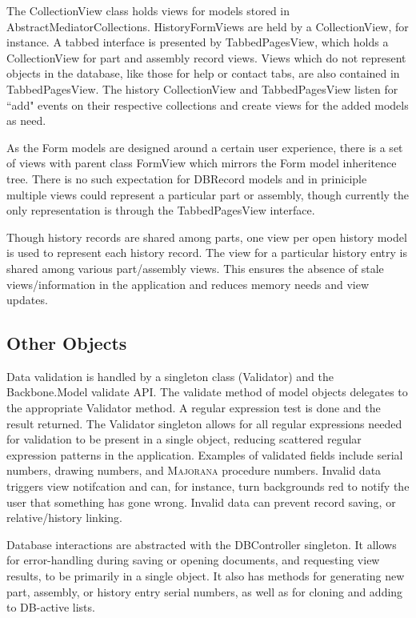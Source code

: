 \documentclass[journal]{IEEEtran}
\begin{document}
The CollectionView class holds views for models stored in AbstractMediatorCollections. HistoryFormViews
are held by a CollectionView, for instance. A tabbed interface is presented by TabbedPagesView,
which holds a CollectionView for part and assembly record views. Views which do not represent objects in the database, like those
for help or contact tabs, are also contained in TabbedPagesView. The history CollectionView and TabbedPagesView
listen for ``add" events on their respective collections and create views for the added models as need.

As the Form models are designed around a certain user experience, there is a set of views with parent class
FormView which mirrors the Form model inheritence tree. There is no such expectation for DBRecord models and
in priniciple multiple views could represent a particular part or assembly, though currently the only representation is
through the TabbedPagesView interface.

Though history records are shared among parts, one view per open history model is used to represent each history
record. The view for a particular history entry is shared among various part/assembly views. This ensures the absence of
stale views/information in the application and reduces memory needs and view updates.

\subsection{Other Objects}
Data validation is handled by a singleton class (Validator) and the Backbone.Model validate API. The validate
method of model objects delegates to the appropriate Validator method.
A regular expression test is done and the result returned. The Validator singleton
allows for all regular expressions needed for validation to be present in a single object, reducing scattered
regular expression patterns in the application. Examples of validated fields include serial numbers, drawing numbers, and \textsc{Majorana} procedure numbers.
Invalid data triggers view notifcation and can, for instance, turn backgrounds 
red to notify the user that something has gone wrong. Invalid data can prevent record saving, or relative/history linking.

Database interactions are abstracted with the DBController singleton. It allows for error-handling during saving or 
opening documents, and requesting view results, to be primarily in a single object. It also has methods for generating new part, assembly, or history
entry serial numbers, as well as for cloning and adding to DB-active lists.
\end{document}
